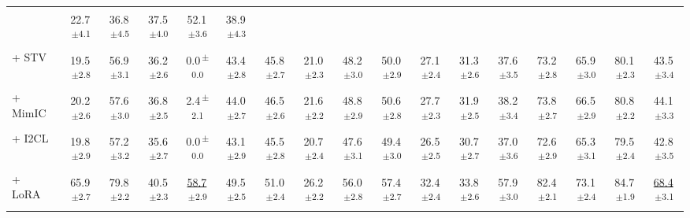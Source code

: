\documentclass[sigconf,review,anonymous,9pt,table]{acmart}
\begin{document}
\begin{table}[t]
{\begin{tabular}{@{}l
  c c
  c c c c c
  c c c c
  c c c c c
  @{}}
  & 22.7\textsuperscript{\,$\pm$4.1} & 36.8\textsuperscript{\,$\pm$4.5} & 37.5\textsuperscript{\,$\pm$4.0} & 52.1\textsuperscript{\,$\pm$3.6} & 38.9\textsuperscript{\,$\pm$4.3} \\
+ STV~\cite{ma2026and}
  & 19.5\textsuperscript{\,$\pm$2.8} & 56.9\textsuperscript{\,$\pm$3.1} & 36.2\textsuperscript{\,$\pm$2.6} & 0.0\textsuperscript{\,$\pm$0.0} & 43.4\textsuperscript{\,$\pm$2.8} & 45.8\textsuperscript{\,$\pm$2.7} & 21.0\textsuperscript{\,$\pm$2.3}
  & 48.2\textsuperscript{\,$\pm$3.0} & 50.0\textsuperscript{\,$\pm$2.9} & 27.1\textsuperscript{\,$\pm$2.4} & 31.3\textsuperscript{\,$\pm$2.6}
  & 37.6\textsuperscript{\,$\pm$3.5} & 73.2\textsuperscript{\,$\pm$2.8} & 65.9\textsuperscript{\,$\pm$3.0} & 80.1\textsuperscript{\,$\pm$2.3} & 43.5\textsuperscript{\,$\pm$3.4} \\
+ MimIC~\cite{jiang2025mimic}
  & 20.2\textsuperscript{\,$\pm$2.6} & 57.6\textsuperscript{\,$\pm$3.0} & 36.8\textsuperscript{\,$\pm$2.5} & 2.4\textsuperscript{\,$\pm$2.1} & 44.0\textsuperscript{\,$\pm$2.7} & 46.5\textsuperscript{\,$\pm$2.6} & 21.6\textsuperscript{\,$\pm$2.2}
  & 48.8\textsuperscript{\,$\pm$2.9} & 50.6\textsuperscript{\,$\pm$2.8} & 27.7\textsuperscript{\,$\pm$2.3} & 31.9\textsuperscript{\,$\pm$2.5}
  & 38.2\textsuperscript{\,$\pm$3.4} & 73.8\textsuperscript{\,$\pm$2.7} & 66.5\textsuperscript{\,$\pm$2.9} & 80.8\textsuperscript{\,$\pm$2.2} & 44.1\textsuperscript{\,$\pm$3.3} \\
+ I2CL~\cite{li2025implicit}
  & 19.8\textsuperscript{\,$\pm$2.9} & 57.2\textsuperscript{\,$\pm$3.2} & 35.6\textsuperscript{\,$\pm$2.7} & 0.0\textsuperscript{\,$\pm$0.0} & 43.1\textsuperscript{\,$\pm$2.9} & 45.5\textsuperscript{\,$\pm$2.8} & 20.7\textsuperscript{\,$\pm$2.4}
  & 47.6\textsuperscript{\,$\pm$3.1} & 49.4\textsuperscript{\,$\pm$3.0} & 26.5\textsuperscript{\,$\pm$2.5} & 30.7\textsuperscript{\,$\pm$2.7}
  & 37.0\textsuperscript{\,$\pm$3.6} & 72.6\textsuperscript{\,$\pm$2.9} & 65.3\textsuperscript{\,$\pm$3.1} & 79.5\textsuperscript{\,$\pm$2.4} & 42.8\textsuperscript{\,$\pm$3.5} \\
+ LoRA~\cite{hu2022lora}
  & 65.9\textsuperscript{\,$\pm$2.7} & 79.8\textsuperscript{\,$\pm$2.2} & 40.5\textsuperscript{\,$\pm$2.3} & \underline{58.7}\textsuperscript{\,$\pm$2.9} & 49.5\textsuperscript{\,$\pm$2.5} & 51.0\textsuperscript{\,$\pm$2.4} & 26.2\textsuperscript{\,$\pm$2.2}
  & 56.0\textsuperscript{\,$\pm$2.8} & 57.4\textsuperscript{\,$\pm$2.7} & 32.4\textsuperscript{\,$\pm$2.4} & 33.8\textsuperscript{\,$\pm$2.6}
  & 57.9\textsuperscript{\,$\pm$3.0} & 82.4\textsuperscript{\,$\pm$2.1} & 73.1\textsuperscript{\,$\pm$2.4} & 84.7\textsuperscript{\,$\pm$1.9} & \underline{68.4}\textsuperscript{\,$\pm$3.1} \\

\end{tabular}}
\end{table}
\end{document}
